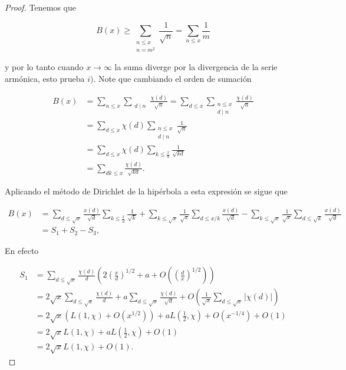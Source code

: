\begin{proof}
Tenemos que

$$B(x)\geq \sum_{\substack{n\leq x\\
n=m^2}}\frac{1}{\sqrt{n}}=\sum_{n\leq x} \frac{1}{m} $$

y por lo tanto cuando $x\to \infty$ la suma diverge por la divergencia de la serie armónica, esto prueba $i)$. Note que cambiando el orden de sumación

\begin{align*}
    B(x) &= \sum_{n \leq x} \sum_{\substack{d \mid n}} \frac{\chi(d)}{\sqrt{n}} 
     = \sum_{d \leq x} \sum_{\substack{n \leq x \\ d \mid n}} \frac{\chi(d)}{\sqrt{n}}\\
     &= \sum_{d \leq x} \chi(d) \sum_{\substack{n \leq x \\ d \mid n}} \frac{1}{\sqrt{n}}\\
     &= \sum_{d \leq x} \chi(d) \sum_{k \leq \frac{x}{d}} \frac{1}{\sqrt{kd}}\\
     &=\sum_{dk \leq x} \frac{\chi(d)}{\sqrt{kd}}
.\end{align*}

Aplicando el método de Dirichlet de la hipérbola a esta expresión se sigue que



$$\begin{aligned}
B(x)& =\sum_{d \leqslant \sqrt{x}} \frac{x(d)}{\sqrt{d}} \sum_{k \leq\frac{x}{d}} \frac{1}{\sqrt{k}}+\sum_{k \leqslant \sqrt{x}} \frac{1}{\sqrt{x}} \sum_{d\leq x / k} \frac{x(d)}{\sqrt{d}}-\sum_{k \leqslant \sqrt{x}} \frac{1}{\sqrt{x}} \sum_{d \leqslant \sqrt{k}} \frac{x(d)}{\sqrt{d}} \\
& =S_1+S_2-S_3,
\end{aligned}$$


En efecto 

\begin{align*}
S_1 &= \sum_{d \leq \sqrt{x}} \frac{\chi(d)}{d} 
\left( 2 \left( \frac{x}{d} \right)^{1/2} +a + O\left( \left( \frac{d}{x} \right)^{1/2} \right) \right) \\
&= 2\sqrt{x} \sum_{d \leq \sqrt{x}} \frac{\chi(d)}{d} 
+ a \sum_{d \leq \sqrt{x}} \frac{\chi(d)}{\sqrt{d}} 
+ O\left( \frac{1}{\sqrt{x}} \sum_{d \leq \sqrt{x}} |\chi(d)| \right) \\
&= 2\sqrt{x} \left( L(1, \chi) + O(x^{1/2}) \right) 
+ a L\left(\frac{1}{2}, \chi\right) + O\left(x^{-1/4}\right) + O(1) \\
&= 2\sqrt{x} L(1, \chi) + a L\left(\frac{1}{2}, \chi\right) + O(1) \\
&= 2\sqrt{x} L(1, \chi) + O(1).
\end{align*}


\end{proof}
